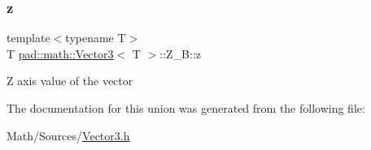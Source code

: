 \subsubsection{\texorpdfstring{z}{z}}
{\footnotesize\ttfamily template$<$typename T$>$ \\
T \mbox{\hyperlink{structpad_1_1math_1_1_vector3}{pad\+::math\+::\+Vector3}}$<$ T $>$\+::Z\+\_\+\+B\+::z}

Z axis value of the vector 

The documentation for this union was generated from the following file\+:\begin{DoxyCompactItemize}
\item 
Math/\+Sources/\mbox{\hyperlink{_vector3_8h}{Vector3.\+h}}\end{DoxyCompactItemize}
